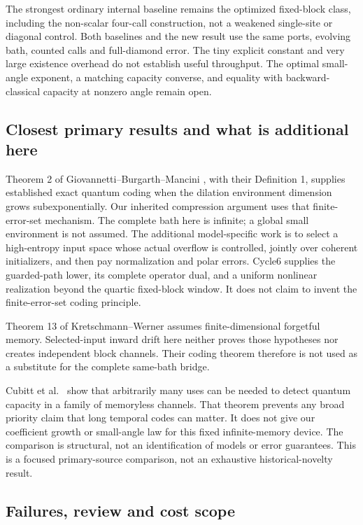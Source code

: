 \documentclass[11pt]{article}
\begin{document}
The strongest ordinary internal baseline remains the optimized fixed-block
class, including the non-scalar four-call construction, not a weakened
single-site or diagonal control. Both baselines and the new result use
the same ports, evolving bath, counted calls and full-diamond error.
The tiny explicit constant and very large existence overhead do not
establish useful throughput. The optimal small-angle exponent, a matching
capacity converse, and equality with backward-classical capacity at
nonzero angle remain open.

\subsection{Closest primary results and what is additional here}

Theorem 2 of Giovannetti--Burgarth--Mancini \cite{GBM}, with their
Definition 1, supplies established exact quantum coding when the dilation
environment dimension grows subexponentially. Our inherited compression
argument uses that finite-error-set mechanism. The complete bath here is
infinite; a global small environment is not assumed. The additional
model-specific work is to select a high-entropy input space whose actual
overflow is controlled, jointly over coherent initializers, and then pay
normalization and polar errors. Cycle6 supplies the guarded-path lower,
its complete operator dual, and a uniform nonlinear realization beyond
the quartic fixed-block window. It does not claim to invent the
finite-error-set coding principle.

Theorem 13 of Kretschmann--Werner \cite{KW} assumes finite-dimensional
forgetful memory. Selected-input inward drift here neither proves those
hypotheses nor creates independent block channels. Their coding theorem
therefore is not used as a substitute for the complete same-bath bridge.

Cubitt et al.\ \cite{Cubitt} show that arbitrarily many uses can be
needed to detect quantum capacity in a family of memoryless channels.
That theorem prevents any broad priority claim that long temporal codes
can matter. It does not give our coefficient growth or small-angle law
for this fixed infinite-memory device. The comparison is structural,
not an identification of models or error guarantees. This is a focused
primary-source comparison, not an exhaustive historical-novelty result.

\subsection{Failures, review and cost scope}
\end{document}
